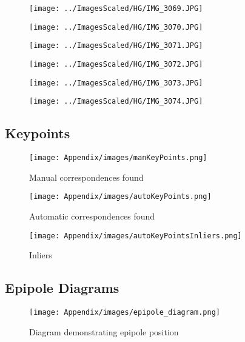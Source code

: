 \begin{figure}[H]
    \centering
    \texttt{[image: ../ImagesScaled/HG/IMG\_3069.JPG]}
\end{figure}
\begin{figure}[H]
    \centering
    \texttt{[image: ../ImagesScaled/HG/IMG\_3070.JPG]}
\end{figure}
\begin{figure}[H]
    \centering
    \texttt{[image: ../ImagesScaled/HG/IMG\_3071.JPG]}
\end{figure}
\begin{figure}[H]
    \centering
    \texttt{[image: ../ImagesScaled/HG/IMG\_3072.JPG]}
\end{figure}
\begin{figure}[H]
    \centering
    \texttt{[image: ../ImagesScaled/HG/IMG\_3073.JPG]}
\end{figure}
\begin{figure}[H]
    \centering
    \texttt{[image: ../ImagesScaled/HG/IMG\_3074.JPG]}
\end{figure}

\subsection{Keypoints}
\label{ap:kp}
\begin{figure}[H]
    \centering
    \texttt{[image: Appendix/images/manKeyPoints.png]}
    \caption{Manual correspondences found}
    \label{keypoints:manual}
 \end{figure}

\begin{figure}[H]
    \centering
    \texttt{[image: Appendix/images/autoKeyPoints.png]}
    \caption{Automatic correspondences found}
    \label{keypoints:auto}
\end{figure}

\begin{figure}[H]
    \centering
    \texttt{[image: Appendix/images/autoKeyPointsInliers.png]}
    \caption{Inliers}
    \label{keypoints:inliers}
\end{figure}

\subsection{Epipole Diagrams}
\label{ap:epipole_diagrams}
    
\begin{figure}[H]
    \centering
    \texttt{[image: Appendix/images/epipole\_diagram.png]}
    \caption{Diagram demonstrating epipole position}
    \label{fig:epipole_diagram}
\end{figure}